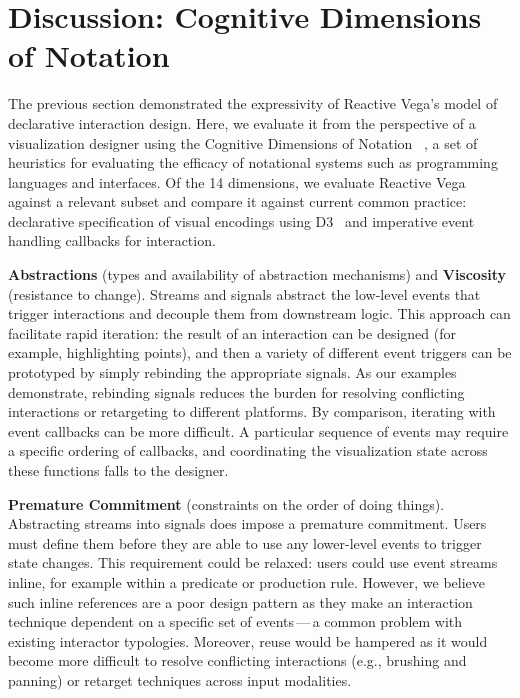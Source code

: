 \section{Discussion: Cognitive Dimensions of Notation}
\label{sec:vg:discussion}

The previous section demonstrated the expressivity of Reactive Vega's model of
declarative interaction design. Here, we evaluate it from the perspective of a
visualization designer using the Cognitive Dimensions of Notation~
\cite{blackwell:cogdim}, a set of heuristics for evaluating the efficacy of
notational systems such as programming languages and interfaces. Of the 14
dimensions, we evaluate Reactive Vega against a relevant subset and compare it
against current common practice: declarative specification of visual encodings
using D3~\cite{bostock:d3} and imperative event handling callbacks for
interaction.

\textbf{Abstractions} (types and availability of abstraction mechanisms) and
\textbf{Viscosity} (resistance to change). Streams and signals abstract the
low-level events that trigger interactions and decouple them from downstream
logic. This approach can facilitate rapid iteration: the result of an
interaction can be designed (for example, highlighting points), and then a
variety of different event triggers can be prototyped by simply rebinding the
appropriate signals. As our examples demonstrate, rebinding signals reduces the
burden for resolving conflicting interactions or retargeting to different
platforms. By comparison, iterating with event callbacks can be more difficult.
A particular sequence of events may require a specific ordering of callbacks,
and coordinating the visualization state across these functions falls to the
designer.

\textbf{Premature Commitment} (constraints on the order of doing things).
Abstracting streams into signals does impose a premature commitment. Users must
define them before they are able to use any lower-level events to trigger state
changes. This requirement could be relaxed: users could use event streams
inline, for example within a predicate or production rule. However, we believe
such inline references are a poor design pattern as they make an interaction
technique dependent on a specific set of events\,---\,a common problem with
existing interactor typologies. Moreover, reuse would be hampered as it would
become more difficult to resolve conflicting interactions (e.g., brushing and
panning) or retarget techniques across input modalities.

